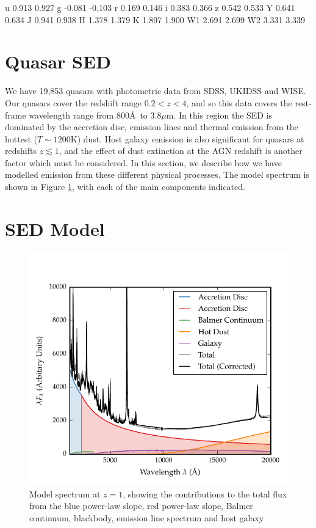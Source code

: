 u  0.913  0.927
g -0.081 -0.103
r  0.169  0.146
i  0.383  0.366
z  0.542  0.533
Y  0.641  0.634
J  0.941  0.938
H  1.378  1.379
K  1.897  1.900
W1 2.691  2.699
W2 3.331  3.339 





\section{Quasar SED}

We have 19,853 quasars with photometric data from SDSS, UKIDSS and WISE. 
Our quasars cover the redshift range $0.2 < z < 4$, and so this data covers the rest-frame wavelength range from 800\AA\, to 3.8$\mu$m. 
In this region the \ac{SED} is dominated by the accretion disc, emission lines and thermal emission from the hottest ($T\sim1200$K) dust. 
Host galaxy emission is also significant for quasars at redshifts $z\lesssim1$, and the effect of dust extinction at the \ac{AGN} redshift is another factor which must be considered.   
In this section, we describe how we have modelled emission from these different physical processes. 
The model spectrum is shown in Figure \ref{fig:modelsed}, with each of the main components indicated. 

\section{SED Model}

\begin{figure}
  \centering
  \includegraphics[width=\textwidth]{figures/chapter05/sed_model.pdf}
  \caption{Model spectrum at $z=1$, showing the contributions to the total flux from the blue power-law slope, red power-law slope, Balmer continuum, blackbody, emission line spectrum and host galaxy}
  \label{fig:modelsed}
\end{figure}



